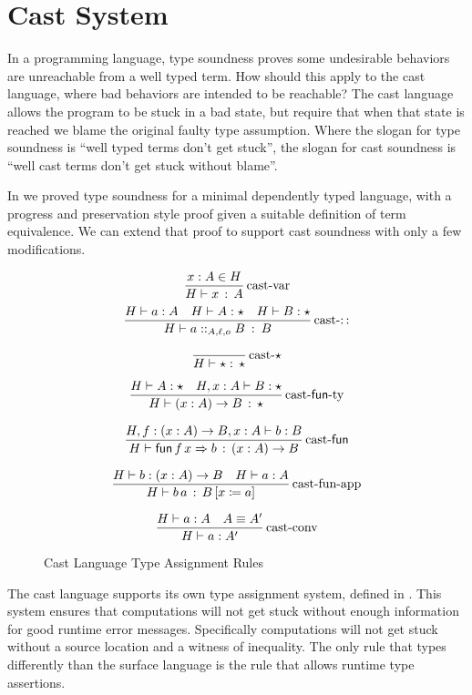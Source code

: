 \section{Cast System}

In a programming language, type soundness proves some undesirable behaviors are unreachable from a well typed term.
How should this apply to the cast language, where bad behaviors are intended to be reachable?
The cast language allows the program to be stuck in a bad state, but require that when that state is reached we blame the original faulty type assumption.
Where the slogan for type soundness is ``well typed terms don't get stuck'', the slogan for cast soundness is ``well cast terms don't get stuck without blame''.

In  we proved type soundness for a minimal dependently typed language, with a progress and preservation style proof given a suitable definition of term equivalence.
We can extend that proof to support cast soundness with only a few modifications.

\begin{figure}
\[
\frac{x:A\in H}{H\vdash x\,:\,A}
\operatorname{cast-var}
\]
\[
\frac{H\vdash a:A\quad H\vdash A:\star\quad H\vdash B:\star}{H\vdash a::_{A,\ell ,o}B\::\:B}
\operatorname{cast-::}
\]

\[
\frac{\,}{H\vdash\star:\,\star}
\operatorname{cast-\star}
\]

\[
\frac{H\vdash A:\star\quad H,x:A\vdash B:\star}{H\vdash\left(x:A\right)\rightarrow B\,:\,\star}
\operatorname{cast-\mathsf{fun}-ty}
\]

\[
\frac{H,f:\left(x:A\right)\rightarrow B,x:A\vdash b:B}{H\vdash\mathsf{fun}\,f\,x\Rightarrow b\,:\,\left(x:A\right)\rightarrow B}
\operatorname{cast-\mathsf{fun}}
\]

\[
\frac{H\vdash b:\left(x:A\right)\rightarrow B\quad H\vdash a:A}{H\vdash b\,a\,:\,B\left[x\coloneqq a\right]}
\operatorname{cast-fun-app}
\]

\[
\frac{H\vdash a:A\quad A\equiv A'}{H\vdash a:A'}
\operatorname{cast-conv}
\]


\caption{Cast Language Type Assignment Rules}
\label{fig:cast-tas-rules}
\end{figure}

The cast language supports its own type assignment system, defined in .
This system ensures that computations will not get stuck without enough information for good runtime error messages.
Specifically computations will not get stuck without a source location and a witness of inequality.
The only rule that types differently than the surface language is the  rule that allows runtime type assertions. 

